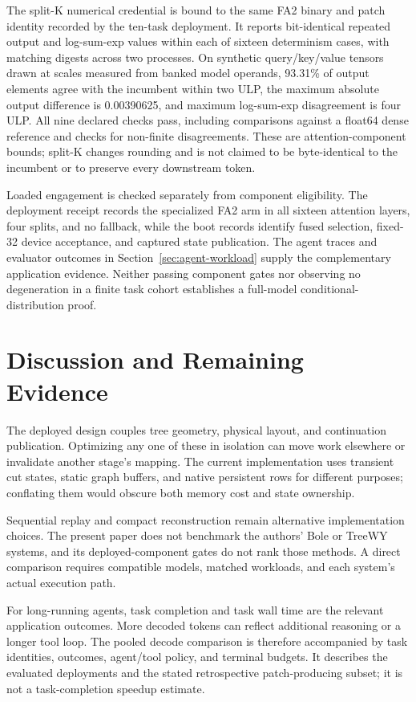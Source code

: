 \documentclass[conference]{IEEEtran}
\begin{document}
The split-K numerical credential is bound to the same FA2 binary and patch identity recorded by the ten-task deployment. It reports bit-identical repeated output and log-sum-exp values within each of sixteen determinism cases, with matching digests across two processes. On synthetic query/key/value tensors drawn at scales measured from banked model operands, 93.31\% of output elements agree with the incumbent within two ULP, the maximum absolute output difference is 0.00390625, and maximum log-sum-exp disagreement is four ULP. All nine declared checks pass, including comparisons against a float64 dense reference and checks for non-finite disagreements. These are attention-component bounds; split-K changes rounding and is not claimed to be byte-identical to the incumbent or to preserve every downstream token.

Loaded engagement is checked separately from component eligibility. The deployment receipt records the specialized FA2 arm in all sixteen attention layers, four splits, and no fallback, while the boot records identify fused selection, fixed-32 device acceptance, and captured state publication. The agent traces and evaluator outcomes in Section~\ref{sec:agent-workload} supply the complementary application evidence. Neither passing component gates nor observing no degeneration in a finite task cohort establishes a full-model conditional-distribution proof.

\section{Discussion and Remaining Evidence}
\label{sec:planned}
The deployed design couples tree geometry, physical layout, and continuation publication. Optimizing any one of these in isolation can move work elsewhere or invalidate another stage's mapping. The current implementation uses transient cut states, static graph buffers, and native persistent rows for different purposes; conflating them would obscure both memory cost and state ownership.

Sequential replay and compact reconstruction remain alternative implementation choices. The present paper does not benchmark the authors' Bole or TreeWY systems, and its deployed-component gates do not rank those methods. A direct comparison requires compatible models, matched workloads, and each system's actual execution path.

For long-running agents, task completion and task wall time are the relevant application outcomes. More decoded tokens can reflect additional reasoning or a longer tool loop. The pooled decode comparison is therefore accompanied by task identities, outcomes, agent/tool policy, and terminal budgets. It describes the evaluated deployments and the stated retrospective patch-producing subset; it is not a task-completion speedup estimate.
\end{document}
